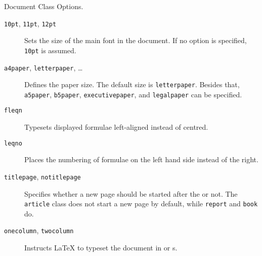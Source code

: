 \begin{table}[!bp]
  \caption{Document Class Options.}\label{options}
  \begin{lined}{\textwidth}
    \begin{FlushLeft}
      \begin{description}
        \item[\normalfont\texttt{10pt}, \texttt{11pt}, \texttt{12pt}] \quad Sets the size
          of the main font in the document. If no option is specified,
          \texttt{10pt} is assumed.
        \item[\normalfont\texttt{a4paper}, \texttt{letterpaper}, \ldots] \quad Defines
          the paper size. The default size is \texttt{letterpaper}. Besides
          that, \texttt{a5paper}, \texttt{b5paper}, \texttt{executivepaper},
          and \texttt{legalpaper} can be specified.

        \item[\normalfont\texttt{fleqn}] \quad Typesets displayed formulae left-aligned
          instead of centred.

        \item[\normalfont\texttt{leqno}] \quad Places the numbering of formulae on the
          left hand side instead of the right.

        \item[\normalfont\texttt{titlepage}, \texttt{notitlepage}] \quad Specifies
          whether a new page should be started after the 
          or not. The \texttt{article} class does not start a new page by
          default, while \texttt{report} and \texttt{book} do.

        \item[\normalfont\texttt{onecolumn}, \texttt{twocolumn}] \quad Instructs \LaTeX{} to typeset the
          document in  or s.


\end{description}
\end{FlushLeft}
\end{lined}
\end{table}
